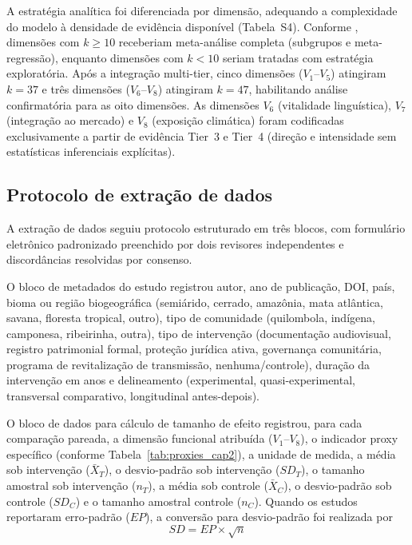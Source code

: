A estratégia analítica foi diferenciada por dimensão, adequando a complexidade do modelo à densidade de evidência disponível (Tabela~S4). Conforme , dimensões com $k \geq 10$ receberiam meta-análise completa (subgrupos e meta-regressão), enquanto dimensões com $k < 10$ seriam tratadas com estratégia exploratória. Após a integração multi-tier, cinco dimensões ($V_1$--$V_5$) atingiram $k = 37$ e três dimensões ($V_6$--$V_8$) atingiram $k = 47$, habilitando análise confirmatória para as oito dimensões. As dimensões $V_6$ (vitalidade linguística), $V_7$ (integração ao mercado) e $V_8$ (exposição climática) foram codificadas exclusivamente a partir de evidência Tier~3 e Tier~4 (direção e intensidade sem estatísticas inferenciais explícitas).

\subsection{Protocolo de extração de dados}
\label{sec:extraction_cap2}

A extração de dados seguiu protocolo estruturado em três blocos, com formulário eletrônico padronizado preenchido por dois revisores independentes e discordâncias resolvidas por consenso.

O bloco de metadados do estudo registrou autor, ano de publicação, DOI, país, bioma ou região biogeográfica (semiárido, cerrado, amazônia, mata atlântica, savana, floresta tropical, outro), tipo de comunidade (quilombola, indígena, camponesa, ribeirinha, outra), tipo de intervenção (documentação audiovisual, registro patrimonial formal, proteção jurídica ativa, governança comunitária, programa de revitalização de transmissão, nenhuma/controle), duração da intervenção em anos e delineamento (experimental, quasi-experimental, transversal comparativo, longitudinal antes-depois).

O bloco de dados para cálculo de tamanho de efeito registrou, para cada comparação pareada, a dimensão funcional atribuída ($V_1$--$V_8$), o indicador proxy específico (conforme Tabela~\ref{tab:proxies_cap2}), a unidade de medida, a média sob intervenção ($\bar{X}_T$), o desvio-padrão sob intervenção ($SD_T$), o tamanho amostral sob intervenção ($n_T$), a média sob controle ($\bar{X}_C$), o desvio-padrão sob controle ($SD_C$) e o tamanho amostral controle ($n_C$). Quando os estudos reportaram erro-padrão ($EP$), a conversão para desvio-padrão foi realizada por
%
\begin{equation}
SD = EP \times \sqrt{n}
\label{eq:sd-ep_cap2}
\end{equation}

